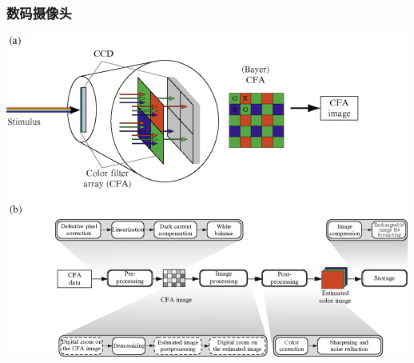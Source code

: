 \documentclass{beamer}
\newcommand{\fullPageImage}[2]{
	{
		\usebackgroundtemplate{\texttt{[image: \#1]}}
		\frame[plain]{#2}
	}
}
\begin{document}
\fullPageImage{images/canon-5d2-front-view_sml.jpg}{\transwipe}
\fullPageImage{images/canon-5d2-k218frontview_sml.jpg}{\transwipe}

\fullPageImage{images/Nokia-808-PureView-Harga.jpg}{\transwipe}

\fullPageImage{images/inside-the-nokia-808-pureview-lens.jpg}{\transwipe}
\fullPageImage{images/pureview-detached.jpg}{\transwipe}
\fullPageImage{images/pureview-lens.jpg}{\transwipe}
\fullPageImage{images/pureview-comparision.jpg}{\transwipe}

\fullPageImage{images/apple-patent-camera.jpg}{\transwipe}
\fullPageImage{images/Apple-Changeable-Lens.jpg}{\transwipe}

\begin{frame}
	\frametitle{数码摄像头}
	\begin{center}
	\includegraphics[width=.8\textwidth]{images/ccd.jpg}
	\end{center}
\end{frame}
\end{document}
